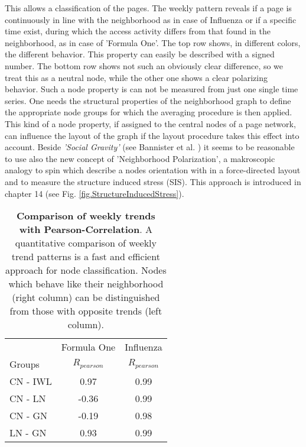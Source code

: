 \documentclass[a4paper,10pt]{scrbook}
\begin{document}
This allows a classification of the pages. The weekly pattern reveals if a page is continuously in line with the neighborhood as in case of Influenza or if a specific time exist, during which the access activity differs from that found in the neighborhood, as in case of 'Formula One'. The top row shows, in different colors, the different behavior. This property can easily be described with a signed number. The bottom row shows not such an obviously clear difference, so we treat this as a neutral node, while the other one shows a clear polarizing behavior. Such a node property is can not be measured from just one single time series. One needs the structural properties of the neighborhood graph to define the appropriate node groups for which the averaging procedure is then applied. This kind of a node property, if assigned to the central nodes of a page network, can influence the layout of the graph if the layout procedure takes this effect into account. Beside \textit{'Social Gravity'} (see Bannister et al. \cite{Bannister2013}) it seems to be reasonable to use also the new concept of 'Neighborhood Polarization', a makroscopic analogy to spin which describe a nodes orientation with in a force-directed layout and to measure the structure induced stress (SIS). This approach is introduced in chapter 14 (see Fig. \ref{fig.StructureInducedStress}). 


\begin{table}[h]
\begin{tabular}{|l|c|c|}
\hline
\rowcolor{LightGray}
  & Formula One & Influenza  \\
Groups & $R_{pearson}$ & $R_{pearson}$  \\
\hline 
CN - IWL  &  0.97	& 0.99 \\
\hline 
CN - LN   &  -0.36  & 0.99  \\
\hline  
CN - GN   & -0.19    &  0.98    \\
\hline 
LN - GN    & 0.93  &  0.99 \\
\hline
\end{tabular}
\caption[\textbf{Comparison of weekly trends with Pearson-Correlation}. Pattern comparison allows simple classification schema.]{\textbf{Comparison of weekly trends with Pearson-Correlation}. A quantitative comparison of weekly trend patterns is a fast and efficient approach for node classification. Nodes which behave like their neighborhood (right column) can be distinguished from those with opposite trends (left column). }
\label{tab.quantitative.pattern.comparison} 
\end{table}
\end{document}
